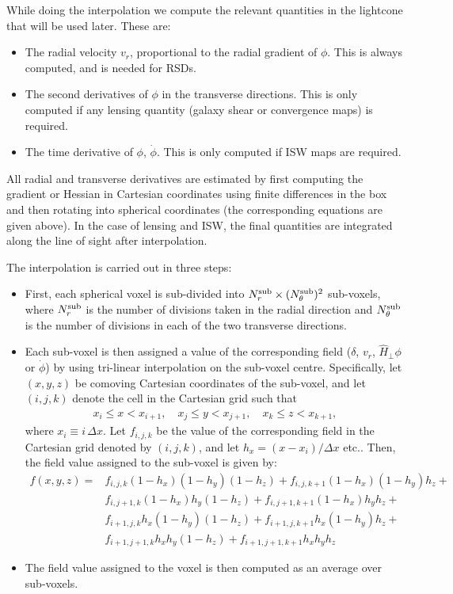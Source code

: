 \documentclass[a4paper,10pt]{article}
\begin{document}
  While doing the interpolation we compute the relevant quantities in the lightcone that will be used later. These are:
  \begin{itemize}
    \item The radial velocity $v_r$, proportional to the radial gradient of $\phi$. This is always computed, and is needed for RSDs.
    \item The second derivatives of $\phi$ in the transverse directions. This is only computed if any lensing quantity (galaxy shear or convergence maps) is required.
    \item The time derivative of $\phi$, $\dot{\phi}$. This is only computed if ISW maps are required.
  \end{itemize}
  All radial and transverse derivatives are estimated by first computing the gradient or Hessian in Cartesian coordinates using finite differences in the box and then rotating into spherical coordinates (the corresponding equations are given above). In the case of lensing and ISW, the final quantities are integrated along the line of sight after interpolation.

  The interpolation is carried out in three steps:
  \begin{itemize}
    \item First, each spherical voxel is sub-divided into $N_r^{\rm sub}\times (N_\theta^{\rm sub})^2$ sub-voxels, where $N^{\rm sub}_r$ is the number of divisions taken in the radial direction and $N^{\rm sub}_\theta$ is the number of divisions in each of the two transverse directions.
    \item Each sub-voxel is then assigned a value of the corresponding field ($\delta$, $v_r$, $\hat{H}_\perp\phi$ or $\dot{\phi}$) by using tri-linear interpolation on the sub-voxel centre. Specifically, let $(x,y,z)$ be comoving Cartesian coordinates of the sub-voxel, and let $(i,j,k)$ denote the cell in the Cartesian grid such that
    \begin{align}
      x_i\leq x<x_{i+1},\hspace{12pt}x_j\leq y<x_{j+1},\hspace{12pt}
      x_k\leq z<x_{k+1},
    \end{align}
    where $x_i\equiv i\,\Delta x$. Let $f_{i,j,k}$ be the value of the corresponding field in the Cartesian grid denoted by $(i,j,k)$, and let $h_x=(x-x_i)/\Delta x$ etc.. Then, the field value assigned to the sub-voxel is given by:
    \begin{align}
      f(x,y,z)=&
       f_{i,j,k}(1-h_x)(1-h_y)(1-h_z)+
       f_{i,j,k+1}(1-h_x)(1-h_y)h_z+\\
      &f_{i,j+1,k}(1-h_x)h_y(1-h_z)+
       f_{i,j+1,k+1}(1-h_x)h_yh_z+\\
      &f_{i+1,j,k}h_x(1-h_y)(1-h_z)+
       f_{i+1,j,k+1}h_x(1-h_y)h_z+\\
      &f_{i+1,j+1,k}h_xh_y(1-h_z)+
       f_{i+1,j+1,k+1}h_xh_yh_z
    \end{align}
    \item The field value assigned to the voxel is then computed as an average over sub-voxels.
  \end{itemize}
\end{document}
